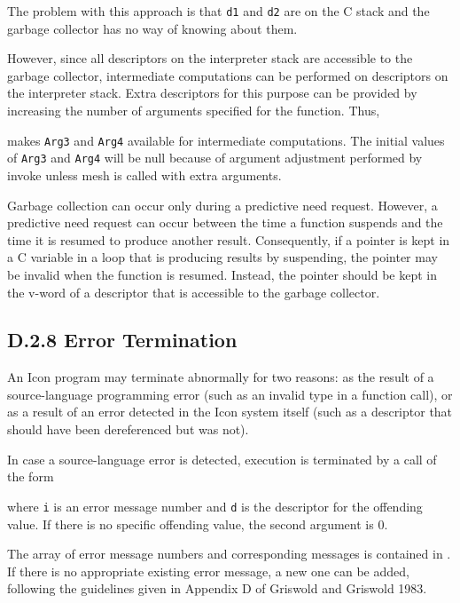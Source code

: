 \noindent
The problem with this approach is that \texttt{d1} and \texttt{d2} are on
the C stack and the garbage collector has no way of knowing about them.

However, since all descriptors on the interpreter stack are accessible
to the garbage collector, intermediate computations can be performed
on descriptors on the interpreter stack. Extra descriptors for this
purpose can be provided by increasing the number of arguments
specified for the function. Thus,


\noindent
makes \texttt{Arg3} and \texttt{Arg4} available for intermediate
computations. The initial values of \texttt{Arg3} and \texttt{Arg4} will be
null because of argument adjustment performed by invoke unless mesh is
called with extra arguments.

Garbage collection can occur only during a predictive need
request. However, a predictive need request can occur between the time
a function suspends and the time it is resumed to produce another
result. Consequently, if a pointer is kept in a C variable in a loop
that is producing results by suspending, the pointer may be invalid
when the function is resumed. Instead, the pointer should be kept in
the v-word of a descriptor that is accessible to the garbage
collector.

\subsection[D.2.8 Error Termination]{D.2.8 Error Termination}

An Icon program may terminate abnormally for two reasons: as the
result of a source-language programming error (such as an invalid type
in a function call), or as a result of an error detected in the Icon
system itself (such as a descriptor that should have been dereferenced
but was not).

In case a source-language error is detected, execution is terminated
by a call of the form


\noindent where \texttt{i} is an error message number and \texttt{d} is the
descriptor for the offending value. If there is no specific offending
value, the second argument is 0.

The array of error message numbers and corresponding messages is
contained in . If there is no appropriate existing error
message, a new one can be added, following the guidelines given in
Appendix D of Griswold and Griswold 1983.

